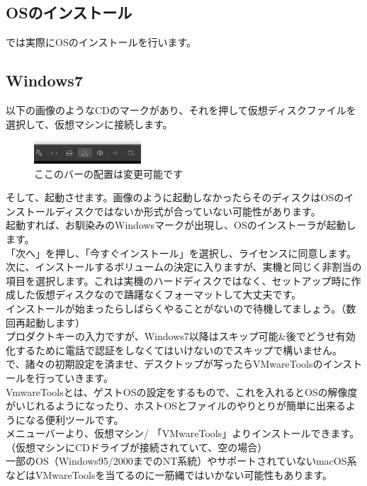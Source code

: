 \documentclass[b5paper,9pt,platex,dvipdfmx]{jsarticle}
\begin{document}
\begin{multicols*}{3}
\section{OSのインストール}
では実際にOSのインストールを行います。\\
\subsection{Windows7}
以下の画像のようなCDのマークがあり、それを押して仮想ディスクファイルを選択して、仮想マシンに接続します。\\
\begin{figure}[H]
  \centering
  \includegraphics[width=4cm]{3.png}
  \caption{ここのバーの配置は変更可能です}
\end{figure}
そして、起動させます。画像のように起動しなかったらそのディスクはOSのインストールディスクではないか形式が合っていない可能性があります。\\
起動すれば、お馴染みのWindowsマークが出現し、OSのインストーラが起動します。\\
「次へ」を押し、「今すぐインストール」を選択し、ライセンスに同意します。\\
次に、インストールするボリュームの決定に入りますが、実機と同じく非割当の項目を選択します。これは実機のハードディスクではなく、セットアップ時に作成した仮想ディスクなので躊躇なくフォーマットして大丈夫です。\\
インストールが始まったらしばらくやることがないので待機してましょう。（数回再起動します）\\
プロダクトキーの入力ですが、Windows7以降はスキップ可能\&後でどうせ有効化するために電話で認証をしなくてはいけないのでスキップで構いません。\\
で、諸々の初期設定を済ませ、デスクトップが写ったらVMwareToolsのインストールを行っていきます。\\
VmwareToolsとは、ゲストOSの設定をするもので、これを入れるとOSの解像度がいじれるようになったり、ホストOSとファイルのやりとりが簡単に出来るようになる便利ツールです。\\
メニューバーより、仮想マシン/ 「VMwareTools」よりインストールできます。（仮想マシンにCDドライブが接続されていて、空の場合）\\
一部のOS（Windows95/2000までのNT系統）やサポートされていないmacOS系などはVMwareToolsを当てるのに一筋縄ではいかない可能性もあります。\\

\end{multicols*}
\end{document}
